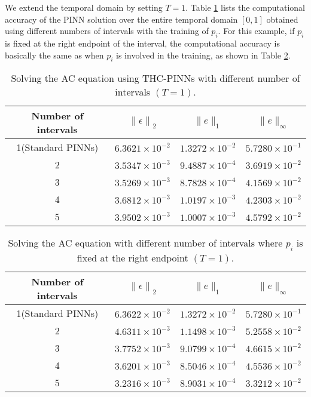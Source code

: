 \documentclass[preprint]{elsarticle}
\numberwithin{table}{section}
\numberwithin{equation}{section}
\numberwithin{figure}{section}
\begin{document}
\begin{CJK}{UTF8}{gbsn}
We extend the temporal domain  by setting $T=1$. Table \ref{AC-multgroup} lists the computational accuracy of the PINN solution over the entire temporal domain  $[0,1]$ obtained using different numbers of intervals with the training of $p_i$. {For this example, if $p_i$
  is fixed at the right endpoint of the interval, the computational accuracy is basically the same as when $p_i$
  is involved in the training,} as shown in Table \ref{AC_fix_multgroup}.

\begin{table}[htbp]
    \centering
    \begin{tabular}{c|ccc}
        \hline
        Number of intervals &  $\left\|\epsilon\right\|_{2}$  & $\|e\|_1 $ & $\|e\|_\infty$ \\ 
        \hline
1(Standard PINNs) & $6.3621 \times 10^{-2}$ & $1.3272 \times 10^{-2}$ & $5.7280 \times 10^{-1}$ \\
2 & $3.5347 \times 10^{-3}$ & $9.4887 \times 10^{-4}$ & $3.6919 \times 10^{-2}$ \\
3 & $3.5269 \times 10^{-3}$ & $8.7828 \times 10^{-4}$ & $4.1569 \times 10^{-2}$ \\
4 & $3.6812 \times 10^{-3}$ & $1.0197 \times 10^{-3}$ & $4.2303 \times 10^{-2}$ \\
5 & $3.9502 \times 10^{-3}$ & $1.0007 \times 10^{-3}$ & $4.5792 \times 10^{-2}$ \\
        \hline
    \end{tabular}
    \caption{Solving the AC equation using THC-PINNs with different number of intervals $(T=1)$.}
    \label{AC-multgroup}
\end{table}

\begin{table}[htbp]
    \centering
    \begin{tabular}{c|ccc}
        \hline
        Number of intervals &  $\left\|\epsilon\right\|_{2}$  & $\|e\|_1 $ & $\|e\|_\infty$ \\ 
        \hline
1(Standard PINNs) & $6.3622 \times 10^{-2}$ & $1.3272 \times 10^{-2}$ & $5.7280 \times 10^{-1}$ \\
2 & $4.6311 \times 10^{-3}$ & $1.1498 \times 10^{-3}$ & $5.2558 \times 10^{-2}$ \\
3 & $3.7752 \times 10^{-3}$ & $9.0799 \times 10^{-4}$ & $4.6615 \times 10^{-2}$ \\
4 & $3.6201 \times 10^{-3}$ & $8.5046 \times 10^{-4}$ & $4.5536 \times 10^{-2}$ \\
5 & $3.2316 \times 10^{-3}$ & $8.9031 \times 10^{-4}$ & $3.3212 \times 10^{-2}$ \\
        \hline
    \end{tabular}
    \caption{
    Solving the AC equation with different number of intervals where $p_i$ is
  fixed at the right endpoint  $(T=1)$.}
    \label{AC_fix_multgroup}
\end{table}


\end{CJK}
\end{document}
